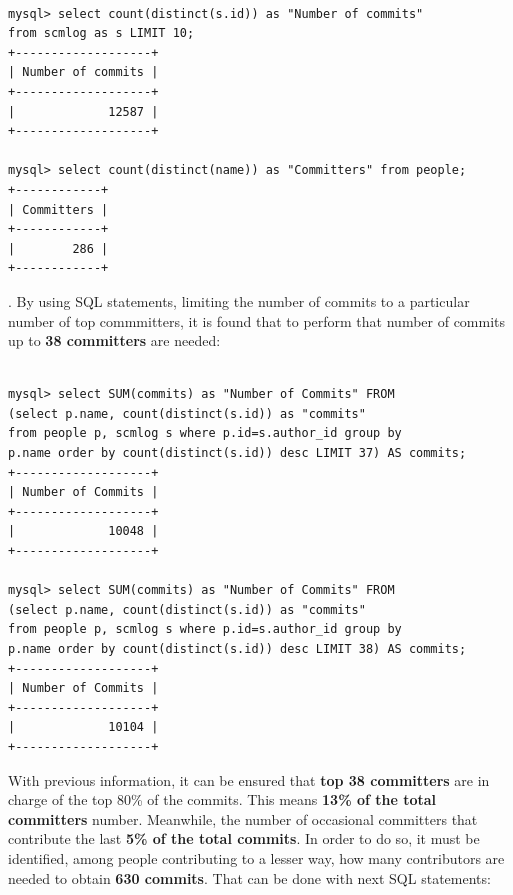 \documentclass[a4paper, 12pt]{book}
\begin{document}
\begin{verbatim}

mysql> select count(distinct(s.id)) as "Number of commits"
from scmlog as s LIMIT 10;
+-------------------+
| Number of commits |
+-------------------+
|             12587 |
+-------------------+

mysql> select count(distinct(name)) as "Committers" from people;
+------------+
| Committers |
+------------+
|        286 |
+------------+

\end{verbatim}

. By using SQL statements, limiting the number of commits to a particular number of top commmitters, it is found that to perform that number of commits up to \textbf{38 committers} are needed:

\begin{verbatim}

mysql> select SUM(commits) as "Number of Commits" FROM
(select p.name, count(distinct(s.id)) as "commits"
from people p, scmlog s where p.id=s.author_id group by
p.name order by count(distinct(s.id)) desc LIMIT 37) AS commits;
+-------------------+
| Number of Commits |
+-------------------+
|             10048 |
+-------------------+

mysql> select SUM(commits) as "Number of Commits" FROM
(select p.name, count(distinct(s.id)) as "commits"
from people p, scmlog s where p.id=s.author_id group by
p.name order by count(distinct(s.id)) desc LIMIT 38) AS commits;
+-------------------+
| Number of Commits |
+-------------------+
|             10104 |
+-------------------+

\end{verbatim}
With previous information, it can be ensured that \textbf{top 38 committers} are in charge of the top 80\% of the commits. This means \textbf{13\% of the total committers} number. Meanwhile, the number of occasional committers that contribute the last \textbf{5\% of the total commits}. In order to do so, it must be identified, among people contributing to a lesser way, how many contributors are needed to obtain \textbf{630 commits}. That can be done with next SQL statements:
\end{document}
